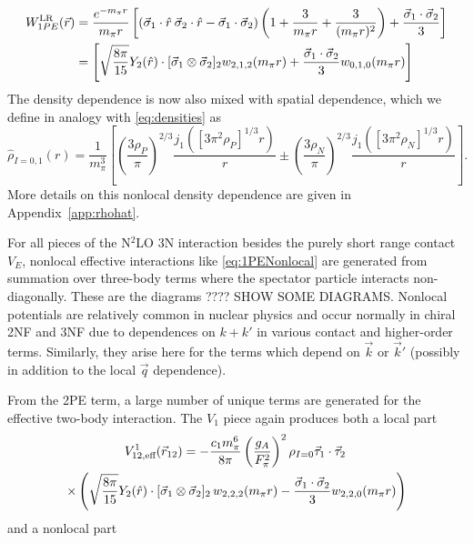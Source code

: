 \begin{equation}\begin{split}
W^{\text{LR}}_{1PE}(\vec{r})&=\frac{e^{-m_\pi r}}{m_\pi r}\left[\left(\vec{\sigma}_1\cdot\hat{r}\:\vec{\sigma}_2\cdot\hat{r}-\vec{\sigma}_1\cdot\vec{\sigma}_2\right)\left(1+\frac{3}{m_\pi r}+\frac{3}{(m_\pi r)^2}\right)+\frac{\vec{\sigma}_1\cdot\vec{\sigma}_2}{3}\right] \\
&=\left[\sqrt{\frac{8\pi}{15}}Y_2(\hat{r})\cdot[\vec{\sigma}_1\otimes\vec{\sigma}_2]_2w_{2,1,2}(m_\pi r)+\frac{\vec{\sigma}_1\cdot\vec{\sigma}_2}{3}w_{0,1,0}(m_\pi r)\right]
\end{split}
\end{equation}
The density dependence is now also mixed with spatial dependence, which we define in analogy with \eqref{eq:densities} as 
\begin{equation}\label{eq:hatdensities}
\hat{\rho}_{I=0,1}(r)=%
\frac{1}{m_\pi^3}\left[ \left(\frac{3 \rho_P}{\pi}\right)^{2/3} \frac{ j_1( [3\pi^2 \rho_P]^{1/3}  r)}{ r} \pm \left(\frac{3 \rho_N}{\pi}\right)^{2/3} \frac{ j_1( [3\pi^2 \rho_N]^{1/3}  r)}{ r} \right].
\end{equation}
More details on this nonlocal density dependence are given in Appendix~\ref{app:rhohat}.

For all pieces of the N$^2$LO 3N interaction besides the purely short range contact $V_E$, nonlocal effective interactions like \eqref{eq:1PENonlocal} are generated from summation over three-body terms where the spectator particle interacts non-diagonally. These are the diagrams ???? SHOW SOME DIAGRAMS. Nonlocal potentials are relatively common in nuclear physics and occur normally in chiral 2NF and 3NF due to dependences on  $k+k'$ in various contact and higher-order terms. Similarly, they arise here for the terms which depend on $\vec{k}$ or $\vec{k}'$ (possibly in addition to the local $\vec{q}$ dependence).


From the 2PE term, a large number of unique terms are generated for the effective two-body interaction. The $V_1$ piece again produces both a local part 
\begin{multline}
V^{1}_{12,\text{eff}}(\vec{r}_{12})=-\frac{c_1 m_\pi^6}{8\pi}\left(\frac{g_A}{F_\pi^2}\right)^2 \rho_{I=0}\vec{\tau}_1\cdot\vec{\tau}_2\:\\
 \times\left(\sqrt{\frac{8\pi}{15}}Y_2(\hat{r})\cdot[\vec{\sigma}_1\otimes\vec{\sigma}_2]_2 \, w_{2,2,2}(m_\pi r) -\frac{\vec{\sigma}_1\cdot\vec{\sigma}_2}{3}  w_{2,2,0}(m_\pi r) \right)
\end{multline}
and a nonlocal part 

